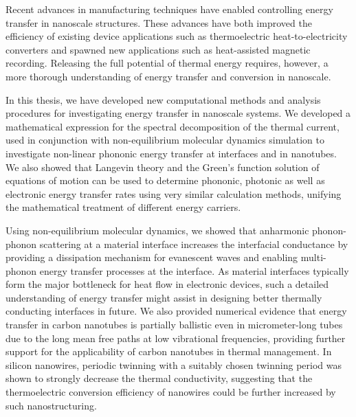 
Recent advances in manufacturing techniques have enabled controlling energy transfer in nanoscale structures. These advances have both improved the efficiency of existing device applications such as thermoelectric heat-to-electricity converters and spawned new applications such as heat-assisted magnetic recording. Releasing the full potential of thermal energy requires, however, a more thorough understanding of energy transfer and conversion in nanoscale.


In this thesis, we have developed new computational methods and analysis procedures for investigating energy transfer in nanoscale systems.  We developed a mathematical expression for the spectral decomposition of the thermal current, used in conjunction with non-equilibrium molecular dynamics simulation to investigate non-linear phononic energy transfer at interfaces and in nanotubes. We also showed that Langevin theory and the Green's function solution of equations of motion can be used to determine phononic, photonic as well as electronic energy transfer rates using very similar calculation methods, unifying the mathematical treatment of different energy carriers. %

Using non-equilibrium molecular dynamics, we showed that anharmonic phonon-phonon scattering at a material interface increases the interfacial conductance by providing a dissipation mechanism for evanescent waves and enabling multi-phonon energy transfer processes at the interface. As material interfaces typically form the major bottleneck for heat flow in electronic devices, such a detailed understanding of energy transfer might assist in designing better thermally conducting interfaces in future. We also provided numerical evidence that energy transfer in carbon nanotubes is partially ballistic even in micrometer-long tubes due to the long mean free paths at low vibrational frequencies, providing further support for the applicability of carbon nanotubes in thermal management. In silicon nanowires, periodic twinning with a suitably chosen twinning period was shown to strongly decrease the thermal conductivity, suggesting that the thermoelectric conversion efficiency of nanowires could be further increased by such nanostructuring. 

